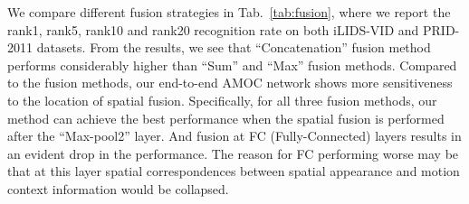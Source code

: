 \documentclass[journal]{IEEEtran}
\begin{document}
We compare different fusion strategies in Tab.~\ref{tab:fusion},  where we report the rank1, rank5, rank10 and rank20 recognition rate on both iLIDS-VID and PRID-2011 datasets. From the results, we see that ``Concatenation'' fusion method performs considerably higher than ``Sum'' and ``Max'' fusion methods. Compared to the fusion methods, our end-to-end AMOC network shows more sensitiveness to the location of spatial fusion. Specifically, for all three fusion methods, our method can achieve the best performance when the spatial fusion is performed after the ``Max-pool2'' layer. And fusion at FC (Fully-Connected) layers results in an evident drop in the performance. The reason for FC performing worse may be that at this layer spatial correspondences between spatial appearance and motion context information would be collapsed.  
\end{document}
